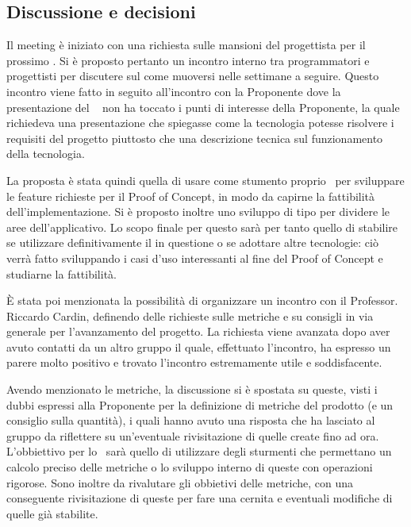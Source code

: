 \subsection{Discussione e decisioni}
\par Il meeting è iniziato con una richiesta sulle mansioni del progettista per il prossimo . 
Si è proposto pertanto un incontro interno tra programmatori e progettisti per discutere sul come muoversi nelle settimane a seguire. 
Questo incontro viene fatto in seguito all'incontro con la Proponente dove la presentazione del \  non ha toccato i punti di interesse della Proponente, la quale richiedeva una presentazione che spiegasse come la tecnologia potesse risolvere i requisiti del progetto piuttosto che una descrizione tecnica sul funzionamento della tecnologia.
\par La proposta è stata quindi quella di usare come stumento proprio \ per sviluppare le feature richieste per il Proof of Concept, in modo da capirne la fattibilità dell'implementazione. 
Si è proposto inoltre uno sviluppo di tipo  per dividere le aree dell'applicativo. 
Lo scopo finale per questo  sarà per tanto quello di stabilire se utilizzare definitivamente il  in questione o se adottare altre tecnologie: ciò verrà fatto sviluppando i casi d'uso interessanti al fine del Proof of Concept e studiarne la fattibilità.
\par È stata poi menzionata la possibilità di organizzare un incontro con il Professor. Riccardo Cardin, definendo delle richieste sulle metriche e su consigli in via generale per l'avanzamento del progetto. 
La richiesta viene avanzata dopo aver avuto contatti da un altro gruppo il quale, effettuato l'incontro, ha espresso un parere molto positivo e trovato l'incontro estremamente utile e soddisfacente.
\par Avendo menzionato le metriche, la discussione si è spostata su queste, visti i dubbi espressi alla Proponente per la definizione di metriche del prodotto (e un consiglio sulla quantità), i quali hanno avuto una risposta che ha lasciato al gruppo da riflettere su un'eventuale rivisitazione di quelle create fino ad ora. 
L'obbiettivo per lo \ sarà quello di utilizzare degli sturmenti che permettano un calcolo preciso delle metriche o lo sviluppo interno di queste con operazioni rigorose. 
Sono inoltre da rivalutare gli obbietivi delle metriche, con una conseguente rivisitazione di queste per fare una cernita e eventuali modifiche di quelle già stabilite.

